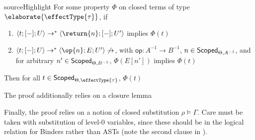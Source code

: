 \begin{definition}{sourceHighlight}
  For some property $\Phi$ on closed terms of type $\elaborate{\effectType{\tau}}$, if
  \begin{enumerate}
    \item $\langle t; [-]; U \rangle \to^{*} \langle \return{n};[-];U' \rangle$ implies $\Phi(t)$
    \item $\langle t; [-]; U \rangle \to^{*} \langle \op{n};E;U' \rangle \not\to$, with $\textsf{op}: A^{-1} \to B^{-1}$, $n \in \textsf{Scoped}_{{\Theta}, {A^{-1}}}$, and for arbitrary $n' \in \textsf{Scoped}_{{\Theta}, {B^{-1}}}$, $\Phi(E[n'])$ implies $\Phi(t)$
  \end{enumerate}
  Then for all $t \in \scoped{\effectType{\tau}}$, $\Phi(t)$
\end{definition}

The proof additionally relies on a closure lemma \citep{kuchta-2023}


Finally, the proof relies on a notion of closed substitution $\rho \vDash \Gamma$. Care must be taken with substitution of level-$0$ variables, since these should be in the logical relation for \textsf{Binder}s rather than \textsf{AST}s (note the second clause in ).


